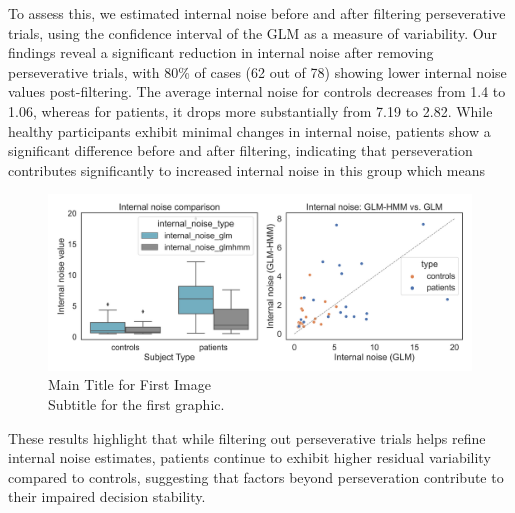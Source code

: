 To assess this, we estimated internal noise before and after filtering perseverative trials, using the confidence interval of the GLM as a measure of variability. Our findings reveal a significant reduction in internal noise after removing perseverative trials, with 80\% of cases (62 out of 78) showing lower internal noise values post-filtering. The average internal noise for controls decreases from 1.4 to 1.06, whereas for patients, it drops more substantially from 7.19 to 2.82. While healthy participants exhibit minimal changes in internal noise, patients show a significant difference before and after filtering, indicating that perseveration contributes significantly to increased internal noise in this group which means 
\begin{figure}[H]
    \centering
    \includegraphics[width=16cm]{MainLayout/Images/chapter7/in_glm_comparison.jpg}
    \caption{Main Title for First Image \\ \small Subtitle for the first graphic.}
    \label{fig:in_glm_comparison}
\end{figure}

These results highlight that while filtering out perseverative trials helps refine internal noise estimates, patients continue to exhibit higher residual variability compared to controls, suggesting that factors beyond perseveration contribute to their impaired decision stability.


